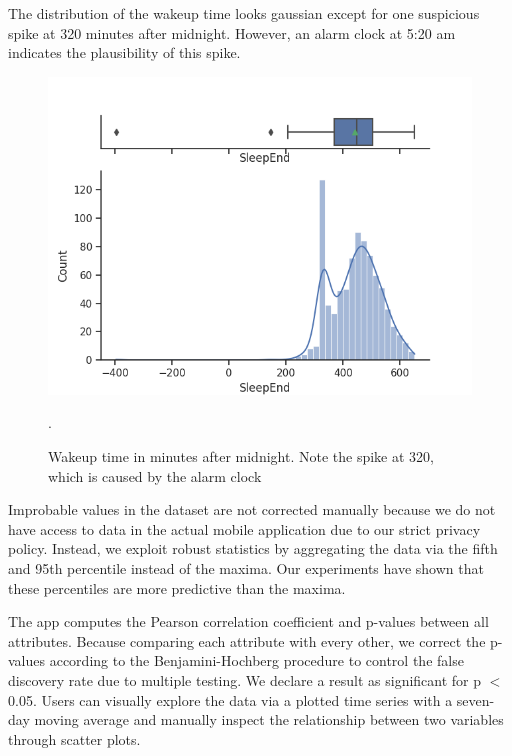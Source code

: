 \documentclass[conference]{IEEEtran}
\begin{document}
The distribution of the wakeup time looks gaussian except for one suspicious spike at 320 minutes after midnight. However, an alarm clock at 5:20 am indicates the plausibility of this spike.
\begin{figure}[htbp]
\begin{center}
\includegraphics[width=1\linewidth]{figs/SleepEnd.png}
\caption{Wakeup time in minutes after midnight. Note the spike at 320, which is caused by the alarm clock}.
\label{fig:alarm}
\end{center}
\end{figure}

Improbable values in the dataset are not corrected manually because we do not have access to data in the actual mobile application due to our strict privacy policy.
Instead, we exploit robust statistics by aggregating the data via the fifth and 95th percentile instead of the maxima. Our experiments have shown that these percentiles are more predictive than the maxima.


The app computes the Pearson correlation coefficient and p-values between all attributes. Because comparing each attribute with every other, we correct the p-values according to the Benjamini-Hochberg procedure\cite{benjamini_controlling_1995} to control the false discovery rate due to multiple testing.
We declare a result as significant for p $<$ 0.05.
Users can visually explore the data via a plotted time series with a seven-day moving average and manually inspect the relationship between two variables through scatter plots.
\end{document}
